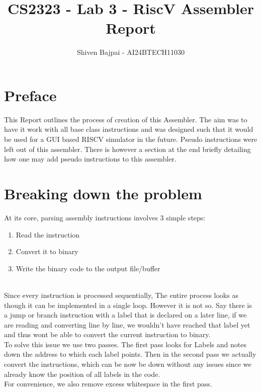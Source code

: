 \documentclass[journal,12pt,onecolumn]{IEEEtran}
\theoremstyle{remark}
\begin{document}
	
	\vspace{3cm}

	\title{CS2323 - Lab 3 - RiscV Assembler Report}
	\author{Shiven Bajpai - AI24BTECH11030}

	\maketitle
	\bigskip

	\renewcommand{\thefigure}{\theenumi}
	\renewcommand{\thetable}{\theenumi}

	\tableofcontents

	\newpage

	\section{Preface}
	This Report outlines the process of creation of this Assembler. The aim was to have it work with all base class instructions and was designed such that it would be used for a GUI based RISCV simulator in the future. 
	Pseudo instructions were left out of this assembler. There is however a section at the end briefly detailing how one may add pseudo instructions to this assembler.

	\section{Breaking down the problem}
	At its core, parsing assembly instructions involves 3 simple steps:\\

	\begin{enumerate}
		\item{Read the instruction}
		\item{Convert it to binary}
		\item{Write the binary code to the output file/buffer\\\\}
	\end{enumerate}

	Since every instruction is processed sequentially, The entire process looks as though it can be implemented in a single loop. However it is not so. Say there is a jump or branch instruction with a label that is declared on a later line, if we are reading and converting line by line, we wouldn't have reached that label yet and thus wont be able to convert the current instruction to binary.\\
	To solve this issue we use two passes. The first pass looks for Labels and notes down the address to which each label points. Then in the second pass we actually convert the instructions, which can be now be down without any issues since we already know the position of all labels in the code.\\
	For convenience, we also remove excess whitespace in the first pass.\\\\
\end{document}

